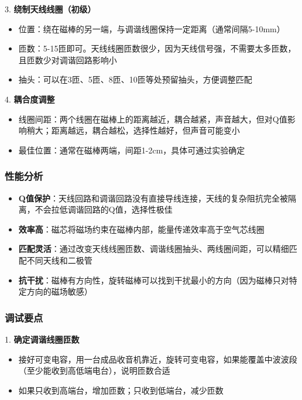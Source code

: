 \documentclass[12pt,UTF8]{ctexbook}
\begin{document}
3. \textbf{绕制天线线圈（初级）}
\begin{itemize}[leftmargin=3.5em]
	\item 位置：绕在磁棒的另一端，与调谐线圈保持一定距离（通常间隔5-10mm）
	\item 匝数：5-15匝即可。天线线圈匝数很少，因为天线信号强，不需要太多匝数，且匝数少对调谐回路影响小
	\item 抽头：可以在3匝、5匝、8匝、10匝等处预留抽头，方便调整匹配
\end{itemize}

4. \textbf{耦合度调整}
\begin{itemize}[leftmargin=3.5em]
	\item 线圈间距：两个线圈在磁棒上的距离越近，耦合越紧，声音越大，但对Q值影响稍大；距离越远，耦合越松，选择性越好，但声音可能变小
	\item 最佳位置：通常在磁棒两端，间距1-2cm，具体可通过实验确定
\end{itemize}

\subsubsection{性能分析}

\begin{itemize}[leftmargin=3.5em]
	\item \textbf{Q值保护}：天线回路和调谐回路没有直接导线连接，天线的复杂阻抗完全被隔离，不会拉低调谐回路的Q值，选择性极佳
	\item \textbf{效率高}：磁芯将磁场约束在磁棒内部，能量传递效率高于空气芯线圈
	\item \textbf{匹配灵活}：通过改变天线线圈匝数、调谐线圈抽头、两线圈间距，可以精细匹配不同天线和二极管
	\item \textbf{抗干扰}：磁棒有方向性，旋转磁棒可以找到干扰最小的方向（因为磁棒只对特定方向的磁场敏感）
\end{itemize}

\subsubsection{调试要点}

1. \textbf{确定调谐线圈匝数}
\begin{itemize}[leftmargin=3.5em]
	\item 接好可变电容，用一台成品收音机靠近，旋转可变电容，如果能覆盖中波波段（至少能收到高低端电台），说明匝数合适
	\item 如果只收到高端台，增加匝数；只收到低端台，减少匝数
\end{itemize}
\end{document}
